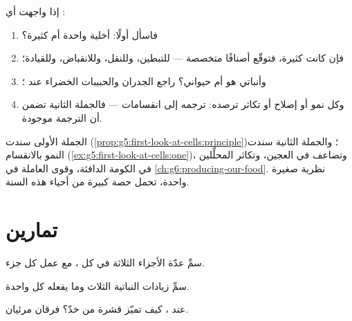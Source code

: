 \begin{method}\label{met:g6:cell-unit-of-life:read}
إذا واجهت أي :
\begin{enumerate}
  \item فاسأل أولًا: أخلية واحدة أم كثيرة؟
  \item فإن كانت كثيرة، فتوقّع أصنافًا متخصصة --- للتبطين،
        وللنقل، وللانقباض، وللقيادة؛
  \item وأنباتي هو أم حيواني؟ راجع الجدران والحبيبات الخضراء عند
        ؛
  \item وكل نمو أو إصلاح أو تكاثر ترصده: ترجمه إلى انقسامات
         --- فالجملة الثانية تضمن أن الترجمة موجودة.
\end{enumerate}
\end{method}

\begin{example}\label{ex:g6:cell-unit-of-life:atwork}
الجملة الأولى سندت 
(\cref{prop:g5:first-look-at-cells:principle})؛ والجملة الثانية
سندت النمو بالانقسام
(\cref{ex:g5:first-look-at-cells:one})، وتضاعف  في العجين،
وتكاثر المحلِّلين في الكومة الدافئة، وقوى  العاملة في
\cref{ch:g6:producing-our-food}. نظرية صغيرة واحدة، تحمل حصة كبيرة
من أحياء هذه السنة.
\end{example}

\section{تمارين}

\begin{exercise}[$\star$]\label{exo:g6:cell-unit-of-life:1}
سمِّ عدّة الأجزاء الثلاثة في كل ، مع عمل كل جزء.
\end{exercise}

\begin{exercise}[$\star$]\label{exo:g6:cell-unit-of-life:2}
سمِّ زيادات  النباتية الثلاث وما يفعله كل واحدة.
\end{exercise}

\begin{exercise}[$\star$]\label{exo:g6:cell-unit-of-life:3}
عند ، كيف تميّز  قشرة  من  خدّ؟ فرقان مرئيان.
\end{exercise}

